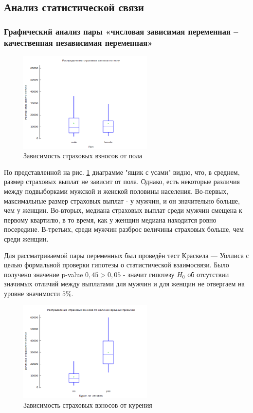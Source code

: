 \documentclass[a4paper,12pt]{article}
\begin{document}
\subsection{Анализ статистической связи}

\subsubsection{Графический анализ пары «числовая зависимая переменная – качественная независимая переменная»}

\begin{figure}[H]
	\includegraphics[width=0.6\textwidth]{../[graphics]/charges-sex.png}
	\centering
	\caption{Зависимость страховых взносов от пола}
	\label{fig:charges-sex}
\end{figure}

По представленной на рис. \ref{fig:charges-sex} диаграмме "ящик с усами" видно, что, в среднем, размер страховых выплат не зависит от пола. Однако, есть некоторые различия между подвыборками мужской и женской половины населения. Во-первых, максимальные размер страховых выплат - у мужчин, и он значительно больше, чем у женщин. Во-вторых, медиана страховых выплат среди мужчин смещена к первому квартилю, в то время, как у женщин медиана находится ровно посередине. В-третьих, среди мужчин разброс величины страховых больше, чем среди женщин.

Для рассматриваемой пары переменных был проведён тест Краскела — Уоллиса с целью формальной проверки гипотезы о статистической взаимосвязи. Было получено значение p-value $0,45 > 0,05$ - значит гипотезу $H_0$ об отсутствии значимых отличий между выплатами для мужчин и для женщин не отвергаем на уровне значимости $5\%$.

\begin{figure}[H]
	\includegraphics[width=0.6\textwidth]{../[graphics]/charges-smoker.png}
	\centering
	\caption{Зависимость страховых взносов от курения}
	\label{fig:charges-smoker}
\end{figure}
\end{document}
